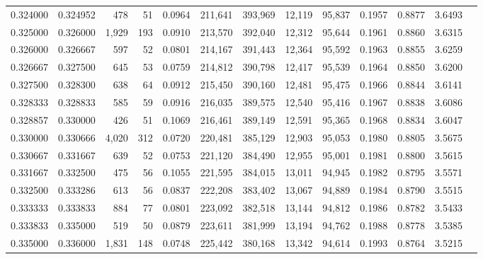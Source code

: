 \begin{tabular}{rrrrrrrrrrrrr}
0.324000 & 0.324952 &   478 &  51 &                                     0.0964 & 211,641 & 393,969 &  12,119 &  95,837 & 0.1957 & 0.8877 & 3.6493 \\
0.325000 & 0.326000 & 1,929 & 193 &                                     0.0910 & 213,570 & 392,040 &  12,312 &  95,644 & 0.1961 & 0.8860 & 3.6315 \\
0.326000 & 0.326667 &   597 &  52 &                                     0.0801 & 214,167 & 391,443 &  12,364 &  95,592 & 0.1963 & 0.8855 & 3.6259 \\
0.326667 & 0.327500 &   645 &  53 &                                     0.0759 & 214,812 & 390,798 &  12,417 &  95,539 & 0.1964 & 0.8850 & 3.6200 \\
0.327500 & 0.328300 &   638 &  64 &                                     0.0912 & 215,450 & 390,160 &  12,481 &  95,475 & 0.1966 & 0.8844 & 3.6141 \\
0.328333 & 0.328833 &   585 &  59 &                                     0.0916 & 216,035 & 389,575 &  12,540 &  95,416 & 0.1967 & 0.8838 & 3.6086 \\
0.328857 & 0.330000 &   426 &  51 &                                     0.1069 & 216,461 & 389,149 &  12,591 &  95,365 & 0.1968 & 0.8834 & 3.6047 \\
0.330000 & 0.330666 & 4,020 & 312 &                                     0.0720 & 220,481 & 385,129 &  12,903 &  95,053 & 0.1980 & 0.8805 & 3.5675 \\
0.330667 & 0.331667 &   639 &  52 &                                     0.0753 & 221,120 & 384,490 &  12,955 &  95,001 & 0.1981 & 0.8800 & 3.5615 \\
0.331667 & 0.332500 &   475 &  56 &                                     0.1055 & 221,595 & 384,015 &  13,011 &  94,945 & 0.1982 & 0.8795 & 3.5571 \\
0.332500 & 0.333286 &   613 &  56 &                                     0.0837 & 222,208 & 383,402 &  13,067 &  94,889 & 0.1984 & 0.8790 & 3.5515 \\
0.333333 & 0.333833 &   884 &  77 &                                     0.0801 & 223,092 & 382,518 &  13,144 &  94,812 & 0.1986 & 0.8782 & 3.5433 \\
0.333833 & 0.335000 &   519 &  50 &                                     0.0879 & 223,611 & 381,999 &  13,194 &  94,762 & 0.1988 & 0.8778 & 3.5385 \\
0.335000 & 0.336000 & 1,831 & 148 &                                     0.0748 & 225,442 & 380,168 &  13,342 &  94,614 & 0.1993 & 0.8764 & 3.5215 \\

\end{tabular}
